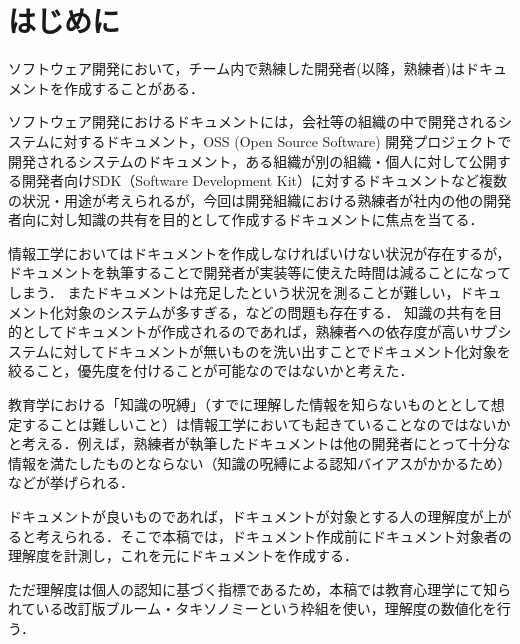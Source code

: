 \section{はじめに}
ソフトウェア開発において，チーム内で熟練した開発者(以降，熟練者)はドキュメントを作成することがある．\cite{bib:ozawa}

ソフトウェア開発におけるドキュメントには，会社等の組織の中で開発されるシステムに対するドキュメント，OSS (Open Source Software) 開発プロジェクトで開発されるシステムのドキュメント，ある組織が別の組織・個人に対して公開する開発者向けSDK（Software Development Kit）に対するドキュメントなど複数の状況・用途が考えられるが，今回は開発組織における熟練者が社内の他の開発者向に対し知識の共有を目的として作成するドキュメントに焦点を当てる．

情報工学においてはドキュメントを作成しなければいけない状況が存在するが，ドキュメントを執筆することで開発者が実装等に使えた時間は減ることになってしまう．
またドキュメントは充足したという状況を測ることが難しい，ドキュメント化対象のシステムが多すぎる，などの問題も存在する．
知識の共有を目的としてドキュメントが作成されるのであれば，熟練者への依存度が高いサブシステムに対してドキュメントが無いものを洗い出すことでドキュメント化対象を絞ること，優先度を付けることが可能なのではないかと考えた．

教育学における「知識の呪縛」（すでに理解した情報を知らないものととして想定することは難しいこと）\cite{bib:kaneda}は情報工学においても起きていることなのではないかと考える．例えば，熟練者が執筆したドキュメントは他の開発者にとって十分な情報を満たしたものとならない（知識の呪縛による認知バイアスがかかるため）などが挙げられる．

ドキュメントが良いものであれば，ドキュメントが対象とする人の理解度が上がると考えられる．そこで本稿では，ドキュメント作成前にドキュメント対象者の理解度を計測し，これを元にドキュメントを作成する．

ただ理解度は個人の認知に基づく指標であるため，本稿では教育心理学にて知られている改訂版ブルーム・タキソノミーという枠組を使い，理解度の数値化を行う．
